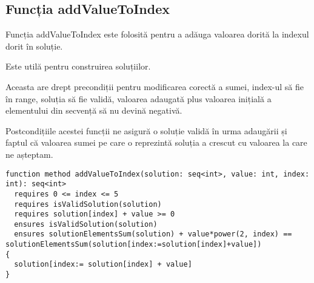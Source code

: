 \subsection{Funcția addValueToIndex}
Funcția addValueToIndex este folosită pentru a adăuga valoarea dorită la indexul dorit în soluție.\par
Este utilă pentru construirea soluțiilor.\par
Aceasta are drept precondiții pentru modificarea corectă a sumei, index-ul să fie în range, soluția să fie validă, 
valoarea adaugată plus valoarea inițială a elementului din secvență să nu devină negativă.\par
Postcondițiile acestei funcții ne asigură o soluție validă în urma adaugării și faptul că valoarea sumei pe care 
o reprezintă soluția a crescut cu valoarea la care ne așteptam.\par
\begin{lstlisting}
function method addValueToIndex(solution: seq<int>, value: int, index: int): seq<int>
  requires 0 <= index <= 5
  requires isValidSolution(solution)
  requires solution[index] + value >= 0
  ensures isValidSolution(solution)
  ensures solutionElementsSum(solution) + value*power(2, index) == solutionElementsSum(solution[index:=solution[index]+value])
{
  solution[index:= solution[index] + value]
}
\end{lstlisting}
